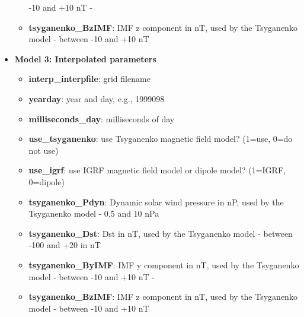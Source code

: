 \documentclass[10pt]{article}
\begin{document}
\begin{itemize}
\begin{itemize}
      -10 and +10 nT -
    \item{\bf tsyganenko\_BzIMF}:
      IMF z component in nT, used by the Tsyganenko model - between
      -10 and +10 nT
    \end{itemize}
  \item{\bf Model 3: Interpolated parameters}
    \begin{itemize}
    \item{\bf interp\_interpfile}:
      grid filename
    \item{\bf yearday}:
      year and day, e.g., 1999098
    \item{\bf milliseconds\_day}:
      milliseconds of day
    \item{\bf use\_tsyganenko}:
      use Tsyganenko magnetic field model? (1=use, 0=do not use)
    \item{\bf use\_igrf}:
      use IGRF magnetic field model or dipole model? (1=IGRF, 0=dipole)
    \item{\bf tsyganenko\_Pdyn}:
      Dynamic solar wind pressure in nP, used by the Tsyganenko model
      - 0.5 and 10 nPa
    \item{\bf tsyganenko\_Dst}:
      Dst in nT, used by the Tsyganenko model - between -100 and +20 in nT
    \item{\bf tsyganenko\_ByIMF}:
      IMF y component in nT, used by the Tsyganenko model - between
      -10 and +10 nT -
    \item{\bf tsyganenko\_BzIMF}:
      IMF z component in nT, used by the Tsyganenko model - between
      -10 and +10 nT
    \end{itemize}


\end{itemize}
\end{document}
